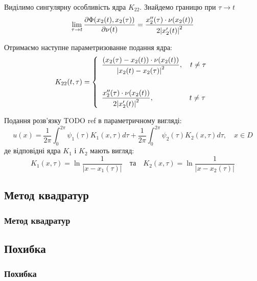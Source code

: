 \documentclass{beamer}
\numberwithin{equation}{section}
\begin{document}
	
	\begin{frame}
		Виділимо сингулярну особливість ядра $K_{22}$. Знайдемо границю при $\tau \rightarrow t$
		$$
		\lim_{\tau \rightarrow t } \pdv{\Phi(x_{2}(t), x_{2}(\tau))}{\nu(t)} =
		\frac{  x''_{2}(\tau) \cdot \nu (x_2(t)) }{ 2\abs{ x'_{2}(t)}^2 } 
		$$
		
		Отримаємо наступне параметризованне подання ядра:
		$$
		K_{22}(t, \tau) = 
		\left\{
		\begin{array}{l}
			\displaystyle
			\frac{ \left( x_{2}(\tau) - x_{2}(t) \right) \cdot \nu (x_2(t)) }{ \abs{ x_{2}(t)-x_{2}(\tau) }^2 } 
			,\quad t \neq \tau
			\\ [1cm]
			
			\displaystyle
			\frac{  x''_{2}(\tau) \cdot \nu (x_2(t)) }{ 2\abs{ x'_{2}(t)}^2 } 
			,\quad \quad  \quad  \quad  \quad  t \neq \tau
		\end{array}
		\right.
		$$
	\end{frame}


	\begin{frame}
		 Подання розв'язку TODO ref в параметричному вигляді:
		$$
		u(x)=\frac{1}{2 \pi} \int_{0}^{2 \pi} \psi_{1}(\tau) K_{1}(x, \tau) d \tau+\frac{1}{2 \pi} \int_{0}^{2 \pi} \psi_{2}(\tau) K_{2}(x, \tau) d \tau, \quad x \in D
		$$
		де відповідні ядра $K_{1}$ і $K_{2}$ мають вигляд:
		$$
		K_{1}(x, \tau)=\ln \frac{1}{\left|x-x_{1}(\tau)\right|}
		\quad \text{та} \quad 
		K_{2}(x, \tau)=\ln \frac{1}{\left|x-x_{2}(\tau)\right|}
		$$
		
		
	\end{frame}


	\subsection{Метод квадратур}
	\begin{frame}
			\frametitle{Метод квадратур}
	\end{frame}
		
	
	\subsection{Похибка}	
	\begin{frame}
		\frametitle{Похибка}
	\end{frame}
	
\end{document}
